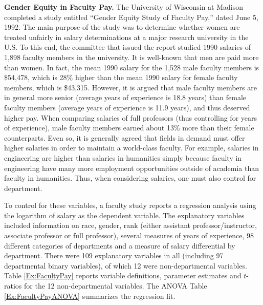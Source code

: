 \begin{exercises}
\item \textbf{Gender Equity in Faculty Pay.} The University of Wisconsin at Madison completed a study entitled
``Gender Equity Study of Faculty Pay,'' dated June 5, 1992. The main
purpose of the study was to determine whether women are treated
unfairly in salary determinations at a major research university in
the U.S. To this end, the committee that issued the report studied
1990 salaries of 1,898 faculty members in the university. It is
well-known that men are paid more than women. In fact, the mean 1990
salary for the 1,528 male faculty members is \$54,478, which is 28\%
higher than the mean 1990 salary for female faculty members, which
is \$43,315. However, it is argued that male faculty members are in
general more senior (average years of experience is 18.8 years) than
female faculty members (average years of experience is 11.9 years),
and thus deserved higher pay. When comparing salaries of full
professors (thus controlling for years of experience), male faculty
members earned about 13\% more than their female counterparts. Even
so, it is generally agreed that fields in demand must offer higher
salaries in order to maintain a world-class faculty. For example,
salaries in engineering are higher than salaries in humanities
simply because faculty in engineering have many more employment
opportunities outside of academia than faculty in humanities. Thus,
when considering salaries, one must also control for department.

To control for these variables, a faculty study reports a regression
analysis using the logarithm of salary as the dependent variable.
The explanatory variables included information on race, gender, rank
(either assistant professor/instructor, associate professor or full
professor), several measures of years of experience, 98 different
categories of departments and a measure of salary differential by
department. There were 109 explanatory variables in all (including
97 departmental binary variables), of which 12 were non-departmental
variables. Table \ref{Ex:FacultyPay} reports variable definitions,
parameter estimates and $t$-ratios for the 12 non-departmental
variables. The ANOVA Table \ref{Ex:FacultyPayANOVA} summarizes the
regression fit.



\end{exercises}
